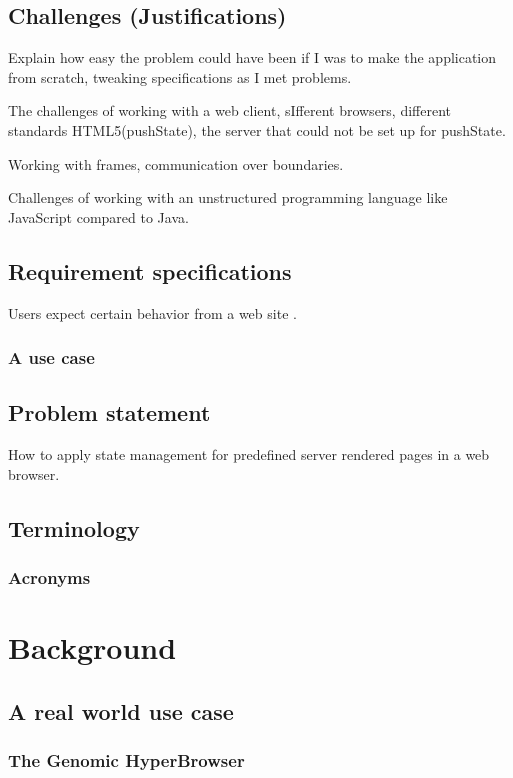 \documentclass[english]{ifimaster}
\begin{document}
\section{Challenges (Justifications)}
Explain how easy the problem could have been if I was to make the application from scratch, tweaking specifications as I met problems.

The challenges of working with a web client, sIfferent browsers, different standards HTML5(pushState), the server that could not be set up for pushState.

Working with frames, communication over boundaries.

Challenges of working with an unstructured programming language like JavaScript compared to Java.

\section{Requirement specifications}
Users expect certain behavior from a web site \parencite{mikowski}.
\subsection{A use case}






\section{Problem statement}
How to apply state management for predefined server rendered pages in a web browser.

\section{Terminology}
\subsection{Acronyms}


\chapter{Background}
\section{A real world use case}
\subsection{The Genomic HyperBrowser}
\end{document}

